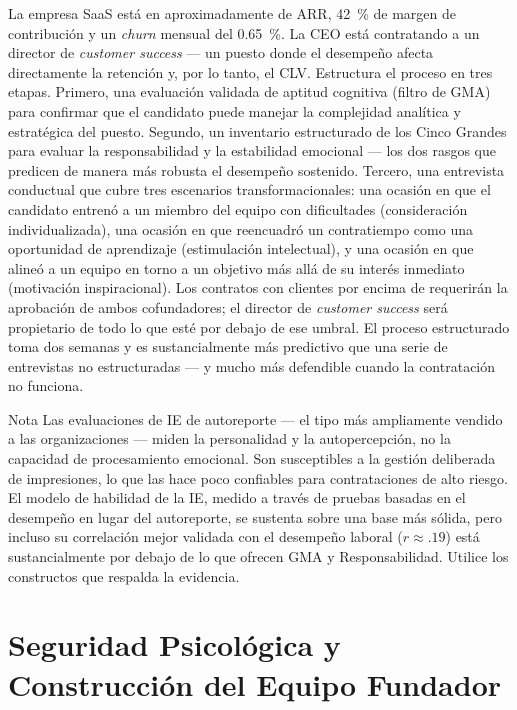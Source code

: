 \begin{example}
La empresa SaaS está en aproximadamente  de ARR, \qty{42}{\percent} de margen
de contribución y un \emph{churn} mensual del \qty{0.65}{\percent}. La CEO está contratando a un
director de \emph{customer success} --- un puesto donde el desempeño afecta directamente la
retención y, por lo tanto, el CLV. Estructura el proceso en tres etapas. Primero, una evaluación
validada de aptitud cognitiva (filtro de GMA) para confirmar que el candidato puede manejar la
complejidad analítica y estratégica del puesto. Segundo, un inventario estructurado de los Cinco
Grandes para evaluar la responsabilidad y la estabilidad emocional --- los dos rasgos que
predicen de manera más robusta el desempeño sostenido. Tercero, una entrevista conductual que
cubre tres escenarios transformacionales: una ocasión en que el candidato entrenó a un miembro
del equipo con dificultades (consideración individualizada), una ocasión en que reencuadró un
contratiempo como una oportunidad de aprendizaje (estimulación intelectual), y una ocasión en
que alineó a un equipo en torno a un objetivo más allá de su interés inmediato (motivación
inspiracional). Los contratos con clientes por encima de  requerirán la aprobación
de ambos cofundadores; el director de \emph{customer success} será propietario de todo lo que
esté por debajo de ese umbral. El proceso estructurado toma dos semanas y es sustancialmente más
predictivo que una serie de entrevistas no estructuradas --- y mucho más defendible cuando la
contratación no funciona.
\end{example}

\begin{admonition}{Nota}
Las evaluaciones de IE de autoreporte --- el tipo más ampliamente vendido a las organizaciones ---
miden la personalidad y la autopercepción, no la capacidad de procesamiento emocional. Son
susceptibles a la gestión deliberada de impresiones, lo que las hace poco confiables para
contrataciones de alto riesgo. El modelo de habilidad de la IE, medido a través de pruebas
basadas en el desempeño en lugar del autoreporte, se sustenta sobre una base más sólida, pero
incluso su correlación mejor validada con el desempeño laboral (\(r \approx .19\)) está
sustancialmente por debajo de lo que ofrecen GMA y Responsabilidad. Utilice los constructos que
respalda la evidencia.
\end{admonition}

\section{Seguridad Psicológica y Construcción del Equipo Fundador}\label{sec:psych-safety-team}

